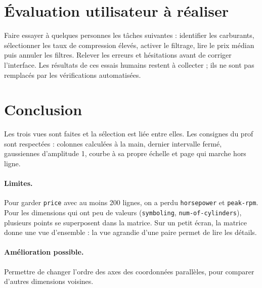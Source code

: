 \documentclass[11pt,a4paper]{article}
\newcommand{\code}[1]{\texttt{#1}}
\begin{document}
\section{Évaluation utilisateur à réaliser}

Faire essayer à quelques personnes les tâches suivantes : identifier les carburants, sélectionner les taux de compression élevés, activer le filtrage, lire le prix médian puis annuler les filtres. Relever les erreurs et hésitations avant de corriger l'interface. Les résultats de ces essais humains restent à collecter ; ils ne sont pas remplacés par les vérifications automatisées.

\section{Conclusion}

Les trois vues sont faites et la sélection est liée entre elles. Les consignes du prof sont respectées : colonnes calculées à la main, dernier intervalle fermé, gaussiennes d'amplitude 1, courbe à sa propre échelle et page qui marche hors ligne.

\paragraph{Limites.} Pour garder \code{price} avec au moins 200 lignes, on a perdu \code{horsepower} et \code{peak-rpm}. Pour les dimensions qui ont peu de valeurs (\code{symboling}, \code{num-of-cylinders}), plusieurs points se superposent dans la matrice. Sur un petit écran, la matrice donne une vue d'ensemble : la vue agrandie d'une paire permet de lire les détails.

\paragraph{Amélioration possible.} Permettre de changer l'ordre des axes des coordonnées parallèles, pour comparer d'autres dimensions voisines.
\end{document}

